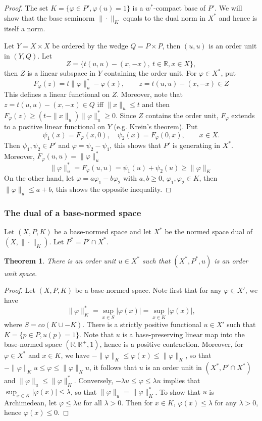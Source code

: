 \documentclass[12pt]{article}
\newtheorem{thm}{Theorem}
\theoremstyle{remark}
\newcommand{\<}{\langle}
\begin{document}
\begin{proof}\cite{ellis? jameson?} The set $K=\{\varphi\in P', \varphi(u)=1\}$  is a  $w^*$-compact  base of $P'$. We will show that the base seminorm $\|\cdot\|_K$ equals to the dual norm in $X^*$ and hence is itself a norm.

Let $Y=X\times X$ be ordered by the wedge $Q=P\times P$, then $(u,u)$ is an order unit in $(Y,Q)$.
Let 
\[
Z=\{t(u,u)-(x,-x),\ t\in \mathbb R, x\in X\},
\]
then $Z$ is a linear subspace in $Y$ containing the order unit. 
For  $\varphi\in X^*$,  put 
\[
F_\varphi(z)=t\|\varphi\|_u^*-\varphi(x), \qquad z=t(u,u)-(x,-x)\in Z
\]
This defines a linear functional on $Z$. Moreover, note that $z=t(u,u)-(x,-x)\in Q$ iff $\|x\|_u\le t$ and then $F_\varphi(z)\ge (t-\|x\|_u)\|\varphi\|_u^*\ge 0$.
Since $Z$ contains the order unit, $F_\varphi$ extends to a positive linear functional on $Y$ (e.g. Krein's theorem). Put 
\[
\psi_1(x)=F_\varphi(x,0),\quad \psi_2(x)=F_\varphi(0,x),\qquad x\in X.
\]
Then $\psi_1,\psi_2\in P'$ and $\varphi=\psi_2-\psi_1$, this shows that $P'$ is generating in $X^*$. Moreover, $F_\varphi(u,u)=\|\varphi\|_u^*$
\[
\|\varphi\|_u^*=F_\varphi(u,u)= \psi_1(u)+\psi_2(u)\ge \|\varphi\|_K
\]
On the other hand, let $\varphi=a\varphi_1- b\varphi_2$ with $a,b\ge 0$, $\varphi_1,\varphi_2\in K$, then
$\|\varphi\|_u\le a+b$, this shows the opposite inequality.

\end{proof}


\subsubsection*{The dual of a base-normed space}

Let $(X,P,K)$ be a base-normed space and let $X^*$ be the normed space dual of $(X,\|\cdot\|_K)$. Let $P^*= P'\cap X^*$.

\begin{thm} There is an order unit $u\in X^*$ such that $(X^*,P^*,u)$  is an order unit space.  

\end{thm}

\begin{proof} Let $(X,P,K)$ be a base-normed space. Note first that for any $\varphi\in X'$, we have
\[
\|\varphi\|_K^*=\sup_{x\in S} |\varphi(x)|=\sup_{x\in K} |\varphi(x)|,
\]
where $S=co(K\cup -K)$. There is a strictly positive functional $u\in X'$ such that 
$K=\{p\in P, u(p)=1\}$. Note that $u$ is a base-preserving linear map into the base-normed space $(\mathbb R,\mathbb R^+,1)$, hence 
is a positive contraction. Moreover, for  $\varphi\in X^*$ and $x\in K$, we have
$-\|\varphi\|_K\le \varphi(x)\le \|\varphi\|_K$, so that $-\|\varphi\|_Ku\le \varphi\le \|\varphi\|_Ku$, it follows that $u$ is an order unit in $(X^*, P'\cap X^*)$ and $\|\varphi\|_u\le \|\varphi\|_K^*$. Conversely,  $-\lambda u\le \varphi\le \lambda u$ 
implies that $\sup_{x\in K}|\varphi(x)|\le \lambda$, so that $\|\varphi\|_u= \|\varphi\|_K^*$. To show that $u$ is Archimedean, 
 let $\varphi\le \lambda u$ for all $\lambda>0$. Then for $x\in K$, $\varphi(x)\le \lambda$ for any $\lambda>0$, hence $\varphi(x)\le 0$. 

\end{proof}
\end{document}
